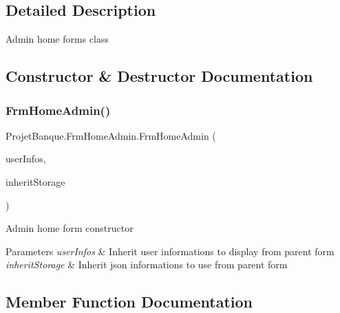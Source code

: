 \subsection{Detailed Description}
Admin home form\textquotesingle{}s class 



\subsection{Constructor \& Destructor Documentation}
\mbox{\label{class_projet_banque_1_1_frm_home_admin_a9bcab88db38eabe3f71e4bb95f30ac8c}} 
\subsubsection{\texorpdfstring{FrmHomeAdmin()}{FrmHomeAdmin()}}
{\footnotesize\ttfamily Projet\+Banque.\+Frm\+Home\+Admin.\+Frm\+Home\+Admin (\begin{DoxyParamCaption}\item[{\mbox{\hyperlink{class_projet_banque_1_1_admin_user}{Admin\+User}}}]{user\+Infos,  }\item[{\mbox{\hyperlink{class_projet_banque_1_1_json_data}{Json\+Data}}}]{inherit\+Storage }\end{DoxyParamCaption})}



Admin home form constructor 


\begin{DoxyParams}{Parameters}
{\em user\+Infos} & Inherit user informations to display from parent form\\
\hline
{\em inherit\+Storage} & Inherit json informations to use from parent form\\
\hline
\end{DoxyParams}


\subsection{Member Function Documentation}
\mbox{\label{class_projet_banque_1_1_frm_home_admin_a460a6dce4ef129c07dd33accd4192cc5}} 
